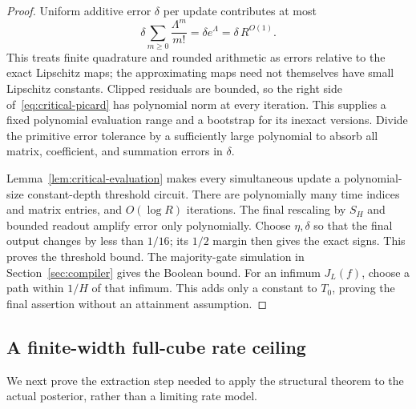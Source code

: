 \documentclass[11pt]{article}
\theoremstyle{remark}
\begin{document}
\begin{proof}
Uniform additive error $\delta$ per update contributes at most
\[
 \delta\sum_{m\ge0}\frac{\Lambda^m}{m!}
 =\delta e^\Lambda=\delta\,R^{O(1)}.
\]
This treats finite quadrature and rounded arithmetic as errors
relative to the exact Lipschitz maps; the approximating maps need
not themselves have small Lipschitz constants. Clipped residuals
are bounded, so the right side of~\eqref{eq:critical-picard} has
polynomial norm at every iteration. This supplies a fixed polynomial
evaluation range and a bootstrap for its inexact versions. Divide
the primitive error tolerance by a sufficiently large polynomial
to absorb all matrix, coefficient, and summation errors in $\delta$.

Lemma~\ref{lem:critical-evaluation} makes every simultaneous
update a polynomial-size constant-depth threshold circuit. There
are polynomially many time indices and matrix entries, and
$O(\log R)$ iterations. The final rescaling by $S_H$ and bounded
readout amplify error only polynomially. Choose $\eta,\delta$ so
that the final output changes by less than $1/16$; its $1/2$ margin
then gives the exact signs. This proves the threshold bound.
The majority-gate simulation in Section~\ref{sec:compiler} gives
the Boolean bound. For an infimum $J_L(f)$, choose a path within
$1/H$ of that infimum. This adds only a constant to $T_0$, proving
the final assertion without an attainment assumption.
\end{proof}

\subsection{A finite-width full-cube rate ceiling}

We next prove the extraction step needed to apply the structural
theorem to the actual posterior, rather than a limiting rate model.
\end{document}
